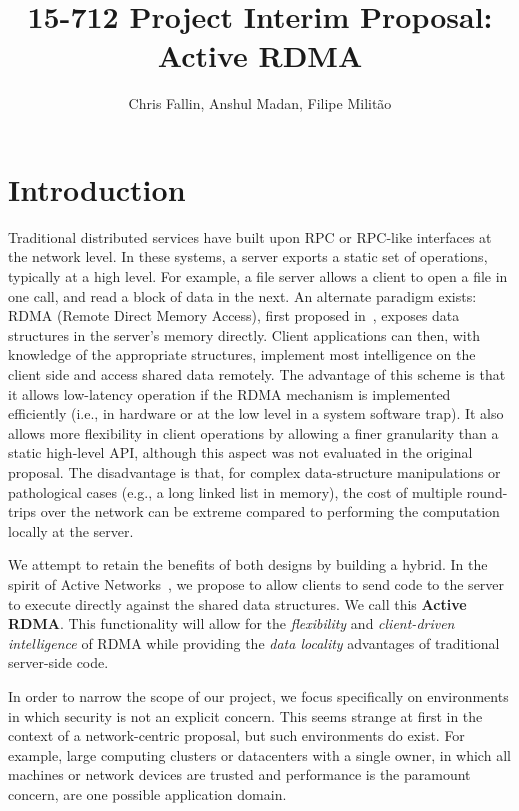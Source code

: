 \documentclass[10pt]{article}
\title{15-712 Project Interim Proposal: Active RDMA}
\author{Chris Fallin, Anshul Madan, Filipe Milit\~{a}o}
\date{}
\begin{document}
\maketitle

\section{Introduction}

Traditional distributed services have built upon RPC or RPC-like
interfaces at the network level. In these systems, a server exports a
static set of operations, typically at a high level. For example, a
file server allows a client to open a file in one call, and read a
block of data in the next. An alternate paradigm exists: RDMA (Remote
Direct Memory Access), first proposed in~\cite{thekkath94}, exposes
data structures in the server's memory directly. Client applications
can then, with knowledge of the appropriate structures, implement most
intelligence on the client side and access shared data remotely. The
advantage of this scheme is that it allows low-latency operation if
the RDMA mechanism is implemented efficiently (i.e., in hardware or at
the low level in a system software trap). It also allows more
flexibility in client operations by allowing a finer granularity than
a static high-level API, although this aspect was not evaluated in the
original proposal. The disadvantage is that, for complex
data-structure manipulations or pathological cases (e.g., a long
linked list in memory), the cost of multiple round-trips over the
network can be extreme compared to performing the computation locally
at the server.

We attempt to retain the benefits of both designs by building a
hybrid. In the spirit of Active Networks~\cite{AN-survey}, we propose
to allow clients to send code to the server to execute directly
against the shared data structures. We call this \textbf{Active
  RDMA}. This functionality will allow for the \emph{flexibility} and
\emph{client-driven intelligence} of RDMA while providing the
\emph{data locality} advantages of traditional server-side code.

In order to narrow the scope of our project, we focus specifically on
environments in which security is not an explicit concern. This seems
strange at first in the context of a network-centric proposal, but
such environments do exist. For example, large computing clusters or
datacenters with a single owner, in which all machines or network
devices are trusted and performance is the paramount concern, are one
possible application domain.
\end{document}
